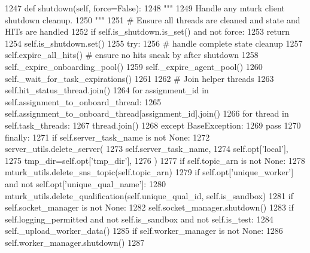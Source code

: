 \begin{DoxyCode}
1247     \textcolor{keyword}{def }shutdown(self, force=False):
1248         \textcolor{stringliteral}{"""}
1249 \textcolor{stringliteral}{        Handle any mturk client shutdown cleanup.}
1250 \textcolor{stringliteral}{        """}
1251         \textcolor{comment}{# Ensure all threads are cleaned and state and HITs are handled}
1252         \textcolor{keywordflow}{if} self.is\_shutdown.is\_set() \textcolor{keywordflow}{and} \textcolor{keywordflow}{not} force:
1253             \textcolor{keywordflow}{return}
1254         self.is\_shutdown.set()
1255         \textcolor{keywordflow}{try}:
1256             \textcolor{comment}{# handle complete state cleanup}
1257             self.expire\_all\_hits()  \textcolor{comment}{# ensure no hits sneak by after shutdown}
1258             self.\_expire\_onboarding\_pool()
1259             self.\_expire\_agent\_pool()
1260             self.\_wait\_for\_task\_expirations()
1261 
1262             \textcolor{comment}{# Join helper threads}
1263             self.hit\_status\_thread.join()
1264             \textcolor{keywordflow}{for} assignment\_id \textcolor{keywordflow}{in} self.assignment\_to\_onboard\_thread:
1265                 self.assignment\_to\_onboard\_thread[assignment\_id].join()
1266             \textcolor{keywordflow}{for} thread \textcolor{keywordflow}{in} self.task\_threads:
1267                 thread.join()
1268         \textcolor{keywordflow}{except} BaseException:
1269             \textcolor{keywordflow}{pass}
1270         \textcolor{keywordflow}{finally}:
1271             \textcolor{keywordflow}{if} self.server\_task\_name \textcolor{keywordflow}{is} \textcolor{keywordflow}{not} \textcolor{keywordtype}{None}:
1272                 server\_utils.delete\_server(
1273                     self.server\_task\_name,
1274                     self.opt[\textcolor{stringliteral}{'local'}],
1275                     tmp\_dir=self.opt[\textcolor{stringliteral}{'tmp\_dir'}],
1276                 )
1277             \textcolor{keywordflow}{if} self.topic\_arn \textcolor{keywordflow}{is} \textcolor{keywordflow}{not} \textcolor{keywordtype}{None}:
1278                 mturk\_utils.delete\_sns\_topic(self.topic\_arn)
1279             \textcolor{keywordflow}{if} self.opt[\textcolor{stringliteral}{'unique\_worker'}] \textcolor{keywordflow}{and} \textcolor{keywordflow}{not} self.opt[\textcolor{stringliteral}{'unique\_qual\_name'}]:
1280                 mturk\_utils.delete\_qualification(self.unique\_qual\_id, self.is\_sandbox)
1281             \textcolor{keywordflow}{if} self.socket\_manager \textcolor{keywordflow}{is} \textcolor{keywordflow}{not} \textcolor{keywordtype}{None}:
1282                 self.socket\_manager.shutdown()
1283             \textcolor{keywordflow}{if} self.logging\_permitted \textcolor{keywordflow}{and} \textcolor{keywordflow}{not} self.is\_sandbox \textcolor{keywordflow}{and} \textcolor{keywordflow}{not} self.is\_test:
1284                 self.\_upload\_worker\_data()
1285             \textcolor{keywordflow}{if} self.worker\_manager \textcolor{keywordflow}{is} \textcolor{keywordflow}{not} \textcolor{keywordtype}{None}:
1286                 self.worker\_manager.shutdown()
1287 
\end{DoxyCode}
